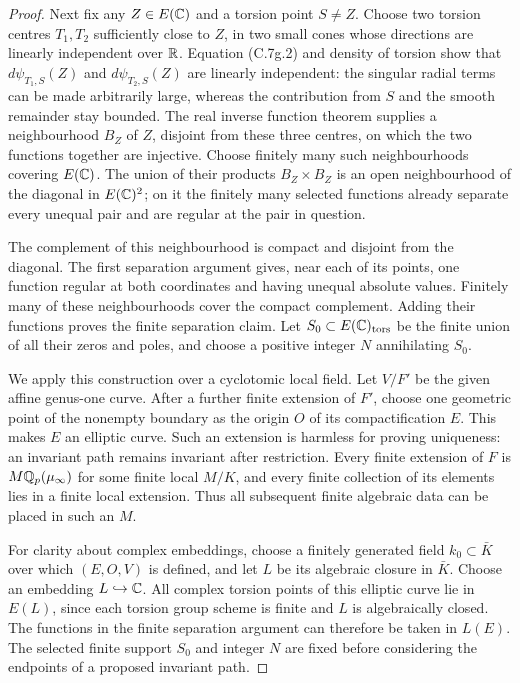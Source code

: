 \begin{proof}
Next fix any $Z\in E(\mathbb C)$ and a torsion point $S\ne Z$.
Choose two torsion centres $T_1,T_2$ sufficiently close to $Z$,
in two small cones whose directions are linearly independent over
$\mathbb R$. Equation (C.7g.2) and density of torsion show that
$d\psi_{T_1,S}(Z)$ and $d\psi_{T_2,S}(Z)$ are linearly independent:
the singular radial terms can be made arbitrarily large, whereas
the contribution from $S$ and the smooth remainder stay bounded.
The real inverse function theorem supplies a neighbourhood $B_Z$
of $Z$, disjoint from these three centres, on which the two
functions together are injective. Choose finitely many such
neighbourhoods covering $E(\mathbb C)$. The union of their products
$B_Z\times B_Z$ is an open neighbourhood of the diagonal in
$E(\mathbb C)^2$; on it the finitely many selected functions already
separate every unequal pair and are regular at the pair in question.

The complement of this neighbourhood is compact and disjoint from
the diagonal. The first separation argument gives, near each of
its points, one function regular at both coordinates and having
unequal absolute values. Finitely many of these neighbourhoods
cover the compact complement. Adding their functions proves the
finite separation claim. Let $S_0\subset E(\mathbb C)_{\rm tors}$ be
the finite union of all their zeros and poles, and choose a positive
integer $N$ annihilating $S_0$.

We apply this construction over a cyclotomic local field. Let
$V/F'$ be the given affine genus-one curve. After a further finite
extension of $F'$, choose one geometric point of the nonempty
boundary as the origin $O$ of its compactification $E$. This
makes $E$ an elliptic curve. Such an extension is harmless for
proving uniqueness: an invariant path remains invariant after
restriction. Every finite extension of $F$ is $M\mathbb Q_p(\mu_\infty)$
for some finite local $M/K$, and every finite collection of its
elements lies in a finite local extension. Thus all subsequent
finite algebraic data can be placed in such an $M$.

For clarity about complex embeddings, choose a finitely generated
field $k_0\subset\bar K$ over which $(E,O,V)$ is defined, and
let $L$ be its algebraic closure in $\bar K$. Choose an embedding
$L\hookrightarrow\mathbb C$. All complex torsion points of this
elliptic curve lie in $E(L)$, since each torsion group scheme is
finite and $L$ is algebraically closed. The functions in the
finite separation argument can therefore be taken in $L(E)$.
The selected finite support $S_0$ and integer $N$ are fixed before
considering the endpoints of a proposed invariant path.


\end{proof}
